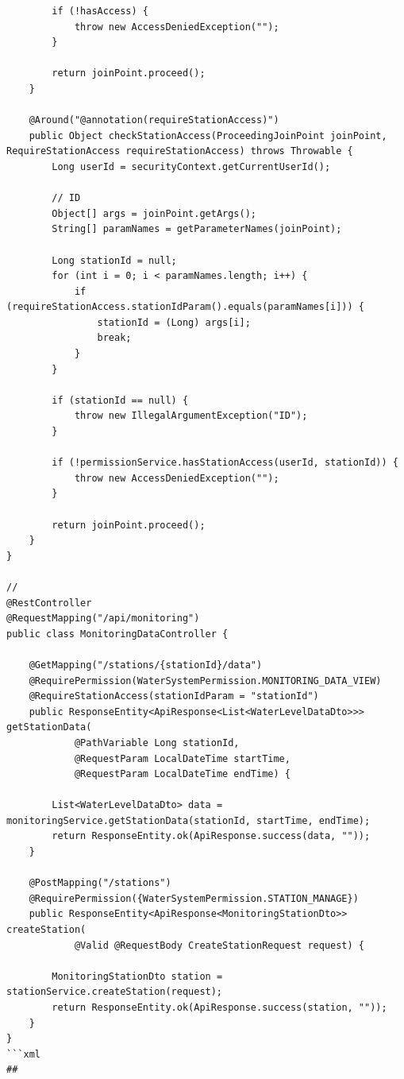 \begin{verbatim}
        if (!hasAccess) {
            throw new AccessDeniedException("");
        }
        
        return joinPoint.proceed();
    }
    
    @Around("@annotation(requireStationAccess)")
    public Object checkStationAccess(ProceedingJoinPoint joinPoint, RequireStationAccess requireStationAccess) throws Throwable {
        Long userId = securityContext.getCurrentUserId();
        
        // ID
        Object[] args = joinPoint.getArgs();
        String[] paramNames = getParameterNames(joinPoint);
        
        Long stationId = null;
        for (int i = 0; i < paramNames.length; i++) {
            if (requireStationAccess.stationIdParam().equals(paramNames[i])) {
                stationId = (Long) args[i];
                break;
            }
        }
        
        if (stationId == null) {
            throw new IllegalArgumentException("ID");
        }
        
        if (!permissionService.hasStationAccess(userId, stationId)) {
            throw new AccessDeniedException("");
        }
        
        return joinPoint.proceed();
    }
}

// 
@RestController
@RequestMapping("/api/monitoring")
public class MonitoringDataController {
    
    @GetMapping("/stations/{stationId}/data")
    @RequirePermission(WaterSystemPermission.MONITORING_DATA_VIEW)
    @RequireStationAccess(stationIdParam = "stationId")
    public ResponseEntity<ApiResponse<List<WaterLevelDataDto>>> getStationData(
            @PathVariable Long stationId,
            @RequestParam LocalDateTime startTime,
            @RequestParam LocalDateTime endTime) {
        
        List<WaterLevelDataDto> data = monitoringService.getStationData(stationId, startTime, endTime);
        return ResponseEntity.ok(ApiResponse.success(data, ""));
    }
    
    @PostMapping("/stations")
    @RequirePermission({WaterSystemPermission.STATION_MANAGE})
    public ResponseEntity<ApiResponse<MonitoringStationDto>> createStation(
            @Valid @RequestBody CreateStationRequest request) {
        
        MonitoringStationDto station = stationService.createStation(request);
        return ResponseEntity.ok(ApiResponse.success(station, ""));
    }
}
```xml
## 


\end{verbatim}
